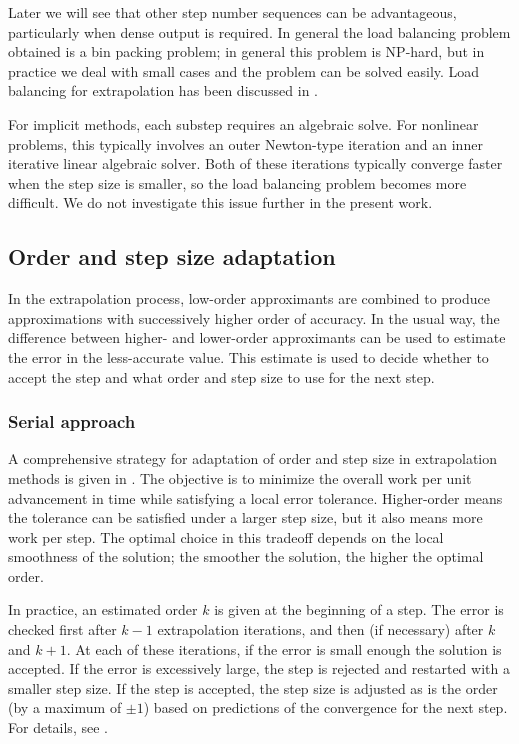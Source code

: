 \documentclass[12pt]{article}
\begin{document}
Later we will see that other step number sequences can be advantageous,
particularly when dense output is required.  In general the load balancing
problem obtained is a bin packing problem;
in general this problem is NP-hard, but in practice we deal with small cases
and the problem can be solved easily.  
Load balancing for extrapolation has been discussed in \cite{VanderHouwen1990,Rauber1997}.

For implicit methods, each substep requires an algebraic solve.
For nonlinear problems, this typically involves an outer Newton-type
iteration and an inner iterative linear algebraic solver.
Both of these iterations typically converge faster when the
step size is smaller, so the load balancing problem becomes more
difficult.  We do not investigate this issue further in the present
work.


\subsection{Order and step size adaptation}
In the extrapolation process, low-order approximants are combined
to produce approximations with successively higher order of accuracy.
In the usual way, the difference between higher- and lower-order
approximants can be used to estimate the error in the less-accurate
value.  This estimate is used to decide whether to accept the step
and what order and step size to use for the next step.

\subsubsection{Serial approach}
A comprehensive strategy for adaptation of order and step size in
extrapolation methods is given in \cite{Hairer1993}.  The objective
is to minimize the overall work per unit advancement in time while
satisfying a local error tolerance.
Higher-order means the tolerance can be satisfied under a larger
step size, but it also means more work per step.  The optimal
choice in this tradeoff depends on the local smoothness of the solution;
the smoother the solution, the higher the optimal order.

In practice, an estimated order $k$ is given at the beginning
of a step.  The error is checked first after $k-1$ extrapolation iterations, 
and then (if necessary) after $k$ and $k+1$.  At each of these iterations,
if the error is small enough the solution is accepted.  If the error
is excessively large, the step is rejected and restarted with a smaller
step size.  If the step is accepted, the step size is adjusted
as is the order (by a maximum of $\pm 1$) based on predictions
of the convergence for the next step.  For details, see 
\cite[pp. 233-235]{Hairer1993}.
\end{document}
